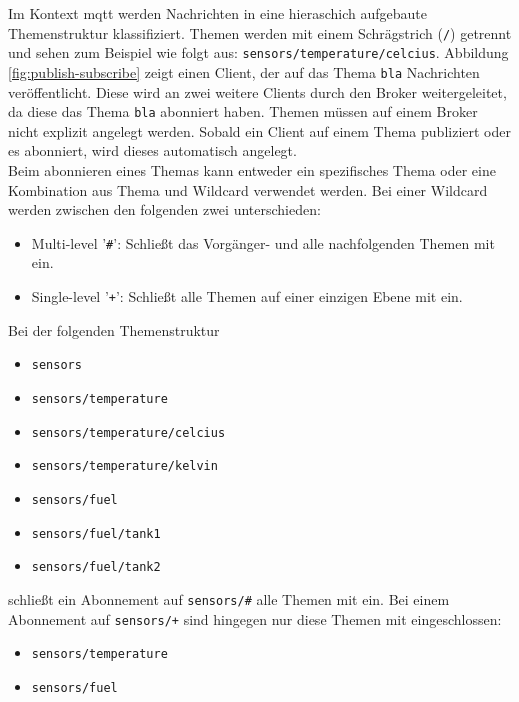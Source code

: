 Im Kontext \ac{mqtt} werden Nachrichten in eine hieraschich aufgebaute Themenstruktur klassifiziert. Themen werden mit einem Schrägstrich (\verb|/|) getrennt und sehen zum Beispiel wie folgt aus: \verb|sensors/temperature/celcius|. Abbildung \ref{fig:publish-subscribe} zeigt einen Client, der auf das Thema \verb|bla| Nachrichten veröffentlicht. Diese wird an zwei weitere Clients durch den Broker weitergeleitet, da diese das Thema \verb|bla| abonniert haben. Themen müssen auf einem Broker nicht explizit angelegt werden. Sobald ein Client auf einem Thema publiziert oder es abonniert, wird dieses automatisch angelegt.\cite{WhatMQTTDefinition}\\
Beim abonnieren eines Themas kann entweder ein spezifisches Thema oder eine Kombination aus Thema und Wildcard verwendet werden. Bei einer Wildcard werden zwischen den folgenden zwei unterschieden:\cite{mqtt5Specification}
\begin{itemize}
    \item Multi-level '\verb|#|': Schlie{\ss}t das Vorgänger- und alle nachfolgenden Themen mit ein.
    \item Single-level '\verb|+|': Schlie{\ss}t alle Themen auf einer einzigen Ebene mit ein.
\end{itemize}
Bei der folgenden Themenstruktur
\begin{itemize}
    \item \verb|sensors|
    \item \verb|sensors/temperature|
    \item \verb|sensors/temperature/celcius|
    \item \verb|sensors/temperature/kelvin|
    \item \verb|sensors/fuel|
    \item \verb|sensors/fuel/tank1|
    \item \verb|sensors/fuel/tank2|
\end{itemize}
schlie{\ss}t ein Abonnement auf \verb|sensors/#| alle Themen mit ein. Bei einem Abonnement auf \verb|sensors/+| sind hingegen nur diese Themen mit eingeschlossen:
\begin{itemize}
    \item \verb|sensors/temperature|
    \item \verb|sensors/fuel|
\end{itemize}


